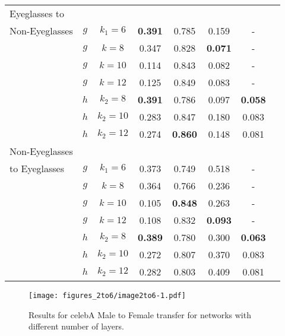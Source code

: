 \documentclass{article} %
\begin{document}
\begin{table}[t]
\begin{tabular}{lccccccc}
\midrule
Eyeglasses to \\
Non-Eyeglasses               & $g$& $k_1=6$  &  \bf{0.391} &	0.785 &	0.159 &            -      \\
                             & $g$& $k=8$  & 0.347      & 0.828      &    \bf{0.071}         &            -      \\
                             & $g$& $k=10$ &   0.114         &    0.843        &   0.082        &       -         \\
                             & $g$& $k=12$ &   0.125         &     0.849       &  0.083           &      -           \\
                             & $h$& $k_2=8$  &    \bf{0.391} & 0.786 & 0.097 & \bf{0.058}                 \\
                             & $h$& $k_2=10$  &     0.283 & 0.847 & 0.180 & 0.083            \\
                             & $h$& $k_2=12$ &   0.274 & \bf{0.860} & 0.148 & 0.081    \\
\midrule
Non-Eyeglasses \\
to Eyeglasses                & $g$& $k_1=6$  &     0.373 & 0.749 & 0.518 &      -      \\
                             & $g$ & $k=8$  & 0.364      & 0.766      &      0.236       &          -        \\
                             & $g$& $k=10$ &   0.105         &     \bf{0.848}       &       0.263      &           -       \\
                             & $g$& $k=12$ &   0.108         &     0.832       &    \bf{0.093}         &         -         \\
                             & $h$& $k_2=8$  &    \bf{0.389} & 0.780 & 0.300 & \bf{0.063}         \\
                             & $h$& $k_2=10$  & 0.272 & 0.807 & 0.370 & 0.083           \\
                             & $h$& $k_2=12$ &   0.282 & 0.803 & 0.409 & 0.081         \\
                             
\bottomrule      
\end{tabular}
\end{table}






\begin{figure}[t]
  \centering
  
 \texttt{[image: figures\_2to6/image2to6-1.pdf]}
  \caption{\label{fig:a001} Results for celebA Male to Female transfer for networks with different number of layers.}
\end{figure}
\end{document}
